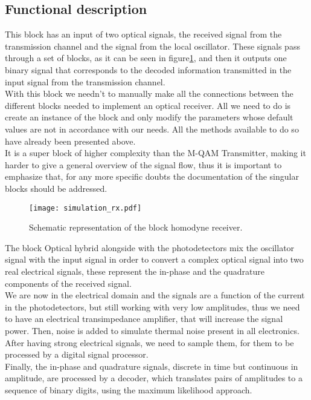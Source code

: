 \subsection*{Functional description}

This block has an input of two optical signals, the received signal from the transmission channel and the signal from the local oscillator. These signals pass through a set of blocks, as it can be seen in figure\ref{fig:homodyneRx_blocks}, and then it outputs one binary signal that corresponds to the decoded information transmitted in the input signal from the transmission channel. \\
With this block we needn't to manually make all the connections between the different blocks needed to implement an optical receiver. All we need to do is create an instance of the block and only modify the parameters whose default values are not in accordance with our needs. All the methods available to do so have already been presented above.\\
It is a super block of higher complexity than the M-QAM Transmitter, making it harder to give a general overview of the signal flow, thus it is important to emphasize that, for any more specific doubts the documentation of the singular blocks should be addressed.
\begin{figure}[H]
	\centering \texttt{[image: simulation\_rx.pdf]}
	\caption{Schematic representation of the block homodyne
	receiver.}\label{fig:homodyneRx_blocks}
\end{figure}
The block Optical hybrid alongside with the photodetectors mix the oscillator signal with the input signal in order to convert a complex optical signal into two real electrical signals, these represent the in-phase and the quadrature components of the received signal.\\
We are now in the electrical domain and the signals are a function of the current in the photodetectors, but still working with very low amplitudes, thus we need to have an electrical transimpedance amplifier, that will increase the signal power. Then, noise is added to simulate thermal noise present in all electronics.\\
After having strong electrical signals, we need to sample them, for them to be processed by a digital signal processor.\\
Finally, the in-phase and quadrature signals, discrete in time but continuous in amplitude, are processed by a decoder, which translates pairs of amplitudes to a sequence of binary digits, using the maximum likelihood approach.


